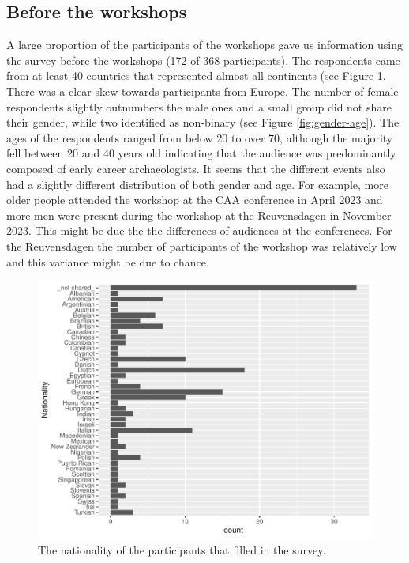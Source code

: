 \documentclass[
]{article}
\begin{document}
\hypertarget{before-the-workshops}{%
\subsection{Before the workshops}\label{before-the-workshops}}

A large proportion of the participants of the workshops gave us information using the survey before the workshops (172 of 368 participants). The respondents came from at least 40 countries that represented almost all continents (see Figure \ref{fig:nationality}. There was a clear skew towards participants from Europe. The number of female respondents slightly outnumbers the male ones and a small group did not share their gender, while two identified as non-binary (see Figure \ref{fig:gender-age}). The ages of the respondents ranged from below 20 to over 70, although the majority fell between 20 and 40 years old indicating that the audience was predominantly composed of early career archaeologists. It seems that the different events also had a slightly different distribution of both gender and age. For example, more older people attended the workshop at the CAA conference in April 2023 and more men were present during the workshop at the Reuvensdagen in November 2023. This might be due the the differences of audiences at the conferences. For the Reuvensdagen the number of participants of the workshop was relatively low and this variance might be due to chance.

\begin{figure}
\centering
\includegraphics{paper_files/figure-latex/nationality-1.pdf}
\caption{\label{fig:nationality}The nationality of the participants that filled in the survey.}
\end{figure}
\end{document}
